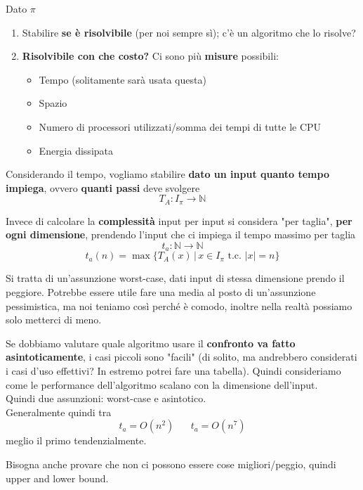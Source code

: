 Dato $\pi$
\begin{enumerate}
	\item Stabilire \textbf{se è risolvibile} (per noi sempre sì); c'è un algoritmo che lo risolve?
	
	\item \textbf{Risolvibile con che costo?} Ci sono più \textbf{misure} possibili:
	\begin{itemize}
		\item Tempo (solitamente sarà usata questa)
		\item Spazio
		\item Numero di processori utilizzati/somma dei tempi di tutte le CPU
		\item Energia dissipata
	\end{itemize}
\end{enumerate}

Considerando il tempo, vogliamo stabilire \textbf{dato un input quanto tempo impiega}, ovvero \textbf{quanti passi} deve svolgere
$$ T_A : I_\pi \rightarrow \mathbb{N}$$

Invece di calcolare la \textbf{complessità} input per input si considera "per taglia", \textbf{per ogni dimensione}, prendendo l'input che ci impiega il tempo massimo per taglia
$$ t_a : \mathbb{N} \rightarrow \mathbb{N}$$
$$ t_a (n) = \max \{T_A (x) \, | \, x \in I_\pi \text{ t.c. } |x| = n\} $$

Si tratta di un'assunzione worst-case, dati input di stessa dimensione prendo il peggiore. Potrebbe essere utile fare una media al posto di un'assunzione pessimistica, ma noi teniamo così perché è comodo, inoltre nella realtà possiamo solo metterci di meno.\\

\newpage

Se dobbiamo valutare quale algoritmo usare il \textbf{confronto va fatto asintoticamente}, i casi piccoli sono "facili" (di solito, ma andrebbero considerati i casi d'uso effettivi? In estremo potrei fare una tabella). Quindi consideriamo come le performance dell'algoritmo scalano con la dimensione dell'input.\\

Quindi due assunzioni: worst-case e asintotico. \\

Generalmente quindi tra
$$ t_a = O (n^2) \;\;\;\;\;\; t_a = O(n^7)$$
meglio il primo tendenzialmente.

Bisogna anche provare che non ci possono essere cose migliori/peggio, quindi upper and lower bound.\\

